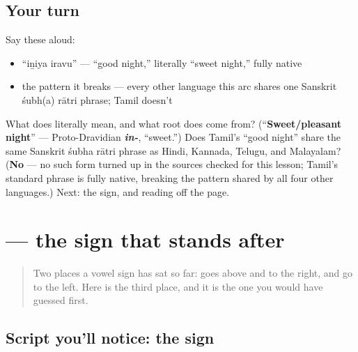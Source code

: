 \subsection*{Your turn}
Say these aloud:

\begin{itemize}
\raggedright
  \item \textquotedblleft{}iṉiya iravu\textquotedblright{} — \textquotedblleft{}good night,\textquotedblright{} literally \textquotedblleft{}sweet night,\textquotedblright{} fully native
  \item the pattern it breaks — every other language this arc shares one Sanskrit śubh(a) rātri phrase; Tamil doesn't
\end{itemize}

\begin{tcolorbox}[breakable,colback=teal!4,colframe=teal!35!black,title={Before you move on}]
What does \textbf{ } literally mean, and what root does \textbf{} come from? (\textquotedblleft{}\textbf{Sweet/pleasant night}\textquotedblright{} — Proto-Dravidian \emph{\textbf{in-}}, \textquotedblleft{}sweet.\textquotedblright{}) Does Tamil's \textquotedblleft{}good night\textquotedblright{} share the same Sanskrit śubha rātri phrase as Hindi, Kannada, Telugu, and Malayalam? (\textbf{No} — no such form turned up in the sources checked for this lesson; Tamil's standard phrase is fully native, breaking the pattern shared by all four other languages.) Next: the  sign, and reading  off the page.
\end{tcolorbox}
\section[\texorpdfstring{\ta{நான்} (nāṉ)}{நான் (nāṉ)}]{ — the sign that stands after}

\label{lesson:TA-W10-read-naan}



\begin{quote}
Two places a vowel sign has sat so far: \textbf{} goes above and to the right, \textbf{} and \textbf{} go to the left. Here is the third place, and it is the one you would have guessed first.
\end{quote}

\subsection*{Script you'll notice: the  sign}

